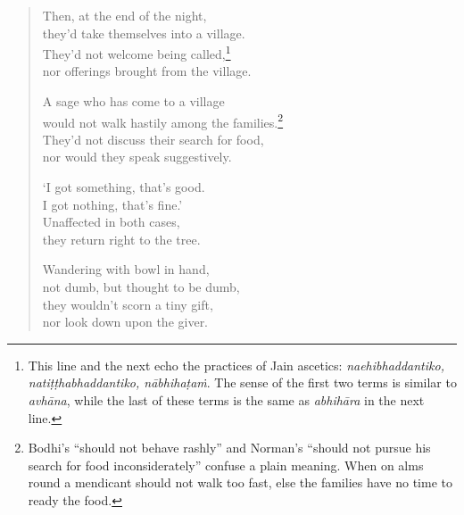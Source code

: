 \documentclass[12pt,openany]{book}%
\begin{document}
\begin{verse}
Then, at the end of the night, \\
they’d take themselves into a village. \\
They’d not welcome being called,\footnote{This line and the next echo the practices of Jain ascetics: \textit{naehibhaddantiko, \textsanskrit{natiṭṭhabhaddantiko}, \textsanskrit{nābhihaṭaṁ}}. The sense of the first two terms is similar to \textit{\textsanskrit{avhāna}}, while the last of these terms is the same as \textit{\textsanskrit{abhihāra}} in the next line. } \\
nor offerings brought from the village. 

A sage who has come to a village \\
would not walk hastily among the families.\footnote{Bodhi’s “should not behave rashly” and Norman’s “should not pursue his search for food inconsiderately” confuse a plain meaning. When on alms round a mendicant should not walk too fast, else the families have no time to ready the food. } \\
They’d not discuss their search for food, \\
nor would they speak suggestively. 

‘I got something, that’s good. \\
I got nothing, that’s fine.’ \\
Unaffected in both cases, \\
they return right to the tree. 

Wandering with bowl in hand, \\
not dumb, but thought to be dumb, \\
they wouldn’t scorn a tiny gift, \\
nor look down upon the giver. 


\end{verse}
\end{document}
